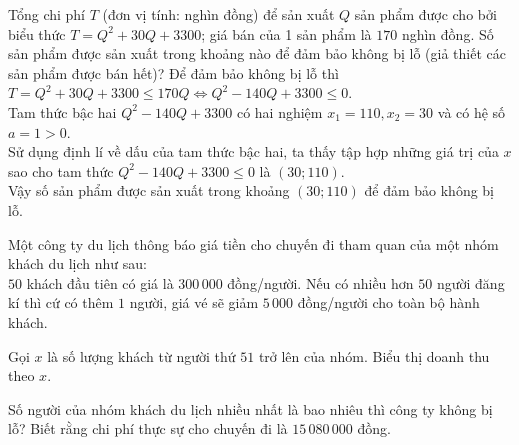 \begin{baitap}
	Tổng chi phí $T$ (đơn vị tính: nghìn đồng) để sản xuất $Q$ sản phẩm được cho bởi biểu thức $T=Q^2+30Q+3300$; giá bán của 1 sản phẩm là $170$ nghìn đồng. Số sản phẩm được sản xuất trong khoảng nào để đảm bảo không bị lỗ (giả thiết các sản phẩm được bán hết)?
	\loigiai
	{
		Để đảm bảo không bị lỗ thì $T=Q^2+30Q+3300 \le 170Q \Leftrightarrow Q^2-140Q+3300\le 0$.\\
		Tam thức bậc hai $Q^2-140Q+3300$ có hai nghiệm $x_1=110, x_2=30$ và có hệ số $a=1>0$.\\
		Sử dụng định lí về dấu của tam thức bậc hai, ta thấy tập hợp những giá trị của $x$ sao cho tam thức $Q^2-140Q+3300\le 0$ là $\left(30;110\right)$.\\
		Vậy số sản phẩm được sản xuất trong khoảng $\left(30;110\right)$ để đảm bảo không bị lỗ.
	}
\end{baitap}
\begin{baitap}%
	Một công ty du lịch thông báo giá tiền cho chuyến đi tham quan của một nhóm khách du lịch như sau:\\
	$50$ khách đầu tiên có giá là $300\,000$ đồng/người. Nếu có nhiều hơn $50$ người đăng kí thì cứ có thêm $1$ người, giá vé sẽ giảm $5\,000$ đồng/người cho toàn bộ hành khách.
	\begin{enumEX}[a)]{1}
		\item Gọi $x$ là số lượng khách từ người thứ $51$ trở lên của nhóm. Biểu thị doanh thu theo $x$.
		\item Số người của nhóm khách du lịch nhiều nhất là bao nhiêu thì công ty không bị lỗ? Biết rằng chi phí thực sự cho chuyến đi là $15\,080\,000$ đồng.
	\end{enumEX}
\end{baitap}
